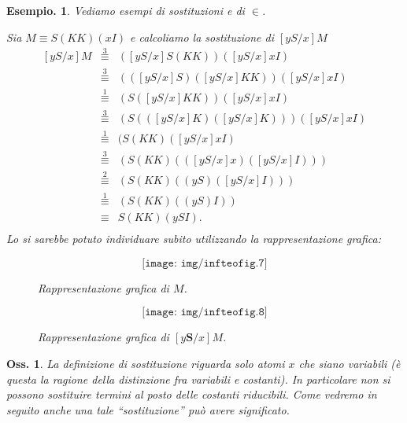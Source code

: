 \documentclass{book}
\newtheorem{osservazione}{Oss.}[chapter]
\newtheorem{esempio}{Esempio.}
\newcommand*{\sss}{\mathbf{S}}   %
\begin{document}
\begin{esempio}
Vediamo esempi di sostituzioni e di $\in$.


\vspace{0.5 cm}Sia  $M \equiv S(KK)(xI)$ e calcoliamo la sostituzione di 
$[yS/x]M$
\[
\begin{array}{lll}
[yS/x]M & \stackrel{3}{\equiv} & ([yS/x]S(KK))([yS/x]xI) \\
& \stackrel{3}{\equiv} & (([yS/x]S)([yS/x]KK))([yS/x]xI) \\
& \stackrel{1}{\equiv} & (S([yS/x]KK))([yS/x]xI)  \\
& \stackrel{3}{\equiv} & (S(([yS/x]K)([yS/x]K)))([yS/x]xI) \\
& \stackrel{1}{\equiv} & (S(KK)([yS/x]xI) \\
& \stackrel{3}{\equiv} & (S(KK)(([yS/x]x)([yS/x]I))) \\
& \stackrel{2}{\equiv} & (S(KK)((yS)([yS/x]I))) \\
& \stackrel{1}{\equiv} & (S(KK)((yS)I)) \\
& \equiv &  S(KK)(ySI).\\
\end{array}
\]
Lo si sarebbe potuto individuare subito utilizzando la rappresentazione 
grafica:
\begin{figure}[!ht]
\[ \texttt{[image: img/infteofig.7]} \]
\caption{Rappresentazione grafica di $M$.}

\[ \texttt{[image: img/infteofig.8]} \]
\caption{Rappresentazione grafica di $[y\sss/x]M$.}
\end{figure}
\end{esempio}

\begin{osservazione}
La definizione di sostituzione riguarda solo atomi $x$ che siano variabili
(\`e questa la ragione della distinzione fra variabili e costanti). In
particolare non si possono sostituire termini al posto delle costanti
riducibili. Come vedremo in seguito anche  una tale ``sostituzione'' pu\`o
avere significato.
\end{osservazione}
\end{document}
